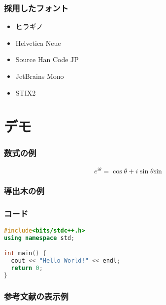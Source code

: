 \documentclass[unicode, 14pt]{beamer}
\begin{document}

\begin{frame}
\frametitle{採用したフォント}
\begin{itemize}
\item ヒラギノ
\item Helvetica Neue
\item Source Han Code JP
\item JetBrains Mono
\item STIX2
\end{itemize}
\end{frame}

\section{デモ}

\begin{frame}
  \frametitle{数式の例}
  \begin{equation}
    e^{i\theta} = \cos\theta + i\sin \theta \mathrm{sin}
  \end{equation}
\end{frame}

\begin{frame}
  \frametitle{導出木の例}
  \begin{prooftree}
  \end{prooftree}
\end{frame}

\begin{frame}[fragile]
\frametitle{コード}
  {\small 
    \begin{lstlisting}[language=C++]
#include<bits/stdc++.h>
using namespace std;

int main() {
  cout << "Hello World!" << endl;
  return 0;
}
    \end{lstlisting}
}
\end{frame}

\begin{frame}[allowframebreaks]
  \frametitle{参考文献の表示例}
  \printbibliography
  \nocite{*} 
\end{frame}
\end{document}
